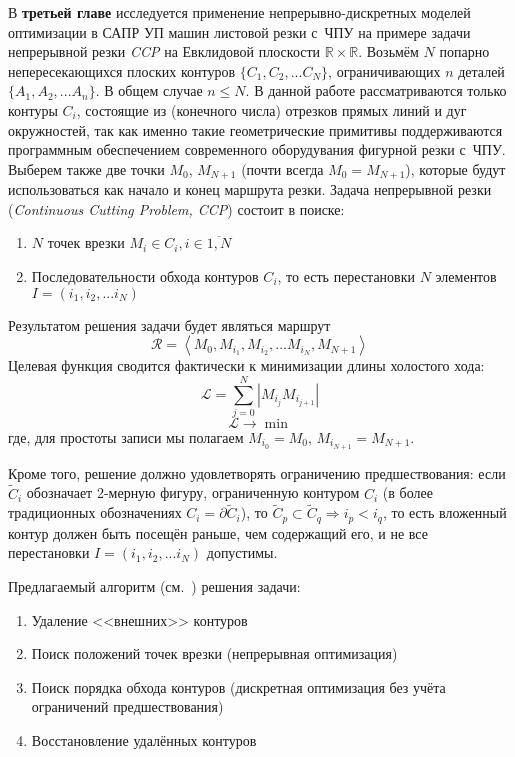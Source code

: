
В {\bf третьей главе}
исследуется
применение непрерывно-дискретных моделей оптимизации
в САПР УП машин листовой резки с~ЧПУ
на примере
задачи непрерывной резки {\it CCP}
на Евклидовой плоскости
$\mathbb R \times \mathbb R$.
Возьмём
$N$
попарно непересекающихся плоских контуров
$\{C_1, C_2, ... C_N\}$,
ограничивающих
$n$
деталей
$\{A_1, A_2, ... A_n\}$.
В общем случае
$n \leqslant N$.
В данной работе рассматриваются только контуры
$C_i$,
состоящие из
(конечного числа)
отрезков прямых линий и дуг окружностей,
так как именно такие геометрические примитивы
поддерживаются программным обеспечением
современного оборудувания фигурной резки с~ЧПУ.
Выберем также две точки
$M_0$, $M_{N + 1}$
(почти всегда $M_0 = M_{N + 1}$),
которые будут использоваться
как начало и конец
маршрута резки.
Задача непрерывной резки
({\it Continuous Cutting Problem, CCP})
состоит в поиске:
\begin{enumerate}
\item
$N$ точек врезки $M_i \in C_i, i \in \overline{1, N}$
\item
Последовательности обхода контуров
$C_i$,
то есть перестановки
$N$
элементов
$I = (i_1, i_2, ... i_N)$
\end{enumerate}
Результатом решения задачи будет являться маршрут
\begin{equation}
  \label{eq:route}
  \mathcal R =
  \left<M_0, M_{i_1}, M_{i_2}, \dots M_{i_N}, M_{N + 1}\right>
\end{equation}
Целевая функция
сводится фактически к минимизации длины холостого хода:
\begin{equation}
  \mathcal{L} = \sum_{j=0}^N|M_{i_j}M_{i_{j+1}}|
  \label{air-move-length}
\end{equation}
$$
\mathcal{L} \to \min
$$
где, для простоты записи мы полагаем
$M_{i_0} = M_0$,
$M_{i_{N + 1}} = M_{N + 1}$.

Кроме того, решение должно удовлетворять ограничению предшествования:
если
$\widetilde C_i$
обозначает 2-мерную фигуру,
ограниченную контуром
$C_i$
(в более традиционных обозначениях
$C_i = \partial \widetilde C_i$),
то
$
 \widetilde C_p \subset \widetilde C_q \Rightarrow i_p < i_q
$,
то есть вложенный контур должен быть посещён раньше,
чем содержащий его,
и не все перестановки
$I = (i_1, i_2, ... i_N)$
допустимы.

Предлагаемый алгоритм
(см.~\cite{berlin2019,bi:ccp:ru})
решения задачи:

\begin{enumerate}
  \item Удаление <<внешних>> контуров
  \item Поиск положений точек врезки (непрерывная оптимизация)
  \item Поиск порядка обхода контуров (дискретная оптимизация без учёта ограничений предшествования)
  \item Восстановление удалённых контуров
\end{enumerate}

